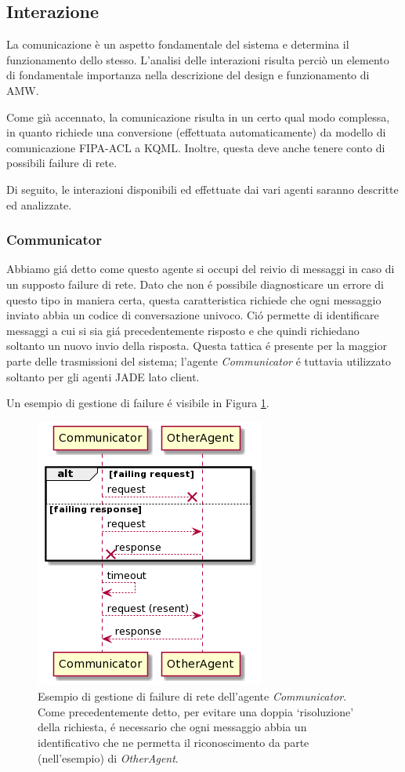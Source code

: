 \subsection{Interazione}

La comunicazione è un aspetto fondamentale del sistema e determina il funzionamento dello stesso. L'analisi delle interazioni risulta perciò un elemento di fondamentale importanza nella descrizione del design e funzionamento di AMW.

Come già accennato, la comunicazione risulta in un certo qual modo complessa, in quanto richiede una conversione (effettuata automaticamente) da modello di comunicazione FIPA-ACL a KQML. Inoltre, questa deve anche tenere conto di possibili failure di rete.

Di seguito, le interazioni disponibili ed effettuate dai vari agenti saranno descritte ed analizzate.

\subsubsection{Communicator}
Abbiamo gi\'a detto come questo agente si occupi del reivio di messaggi in caso di un supposto failure di rete. Dato che non \'e possibile diagnosticare un errore di questo tipo in maniera certa, questa caratteristica richiede che ogni messaggio inviato abbia un codice di conversazione univoco. Ci\'o permette di identificare messaggi a cui si sia gi\'a precedentemente risposto e che quindi richiedano soltanto un nuovo invio della risposta. Questa tattica \'e presente per la maggior parte delle trasmissioni del sistema; l'agente \textit{Communicator} \'e tuttavia utilizzato soltanto per gli agenti JADE lato client.

Un esempio di gestione di failure \'e visibile in Figura \ref{fig:communicator_sequence_diagram}.
\begin{figure}[!ht]\centering
    \includegraphics[width=.5\textwidth]{section/design/figure/agent/communicator_interaction.png}
    \caption{Esempio di gestione di failure di rete dell'agente \textit{Communicator}. Come precedentemente detto, per evitare una doppia `risoluzione' della richiesta, \'e necessario che ogni messaggio abbia un identificativo che ne permetta il riconoscimento da parte (nell'esempio) di \textit{OtherAgent}.}
    \label{fig:communicator_sequence_diagram}
\end{figure}

